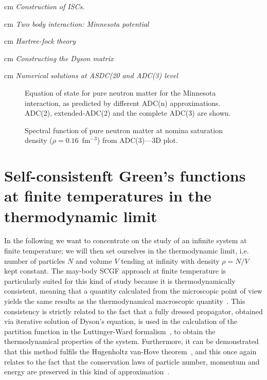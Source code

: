  cm
{\em Construction of ISCs.}

 cm
{\em Two body interaction: Minnesota potential}

 cm
{\em Hartree-fock theory}

 cm
{\em Constructing the Dyson matrix}

 cm
{\em Numerical solutions at ASDC(20 and ADC(3) level}



\begin{figure}[ht]
\begin{center}
\caption{Equation of state for pure neutron matter for the Minnesota interaction, as predicted by different ADC(n) approximations. ADC(2), extended-ADC(2) and the complete ADC(3) are shown.}
\label{fig:minn_adc_eos}
\end{center}
\end{figure}



\begin{figure}[ht]
\begin{center}
\caption{Spectral function of pure neutron matter at nomina saturation density ($\rho=0.16$~fm$^{-3}$) from ADC(3)---3D plot. }
\label{fig:minn_adc_sfnct}
\end{center}
\end{figure}


\section{Self-consistenft Green's functions at finite temperatures in the thermodynamic limit}
\label{sec:scgf_finiteT}

In the following we want to concentrate on the study of an infinite system at finite temperature; we will then set ourselves in the thermodynamic limit, i.e. number of particles $N$ and volume $V$ tending at infinity with density $\rho=N/V$ kept constant. The may-body SCGF approach at finite temperature is particularly suited for this kind of study because it is thermodynamically consistent, meaning that a quantity calculated from the microscopic point of view yields the same results as the thermodynamical macroscopic quantity~\cite{Baym1962}. This consistency is strictly related to the fact that a fully dressed propagator, obtained via iterative solution of Dyson's equation, is used in the calculation of the partition function in the Luttinger-Ward formalism~\cite{Luttinger1960}, to obtain the thermodynamical properties of the system. Furthermore, it can be demonstrated that this method fulfils the Hugenholtz van-Hove theorem~\cite{Hugenholtz1958}, and this once again relates to the fact that the conservation laws of particle number, momentum and energy are preserved in this kind of approximation~\cite{Baym1961,Baym1962}.

